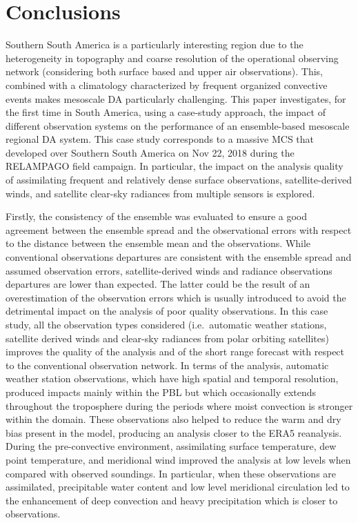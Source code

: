 \documentclass[final,5p,times,twocolumn,authoryear]{elsarticle} %
\begin{document}
\hypertarget{conclusions}{%
\section{Conclusions}\label{conclusions}}

Southern South America is a particularly interesting region due to the heterogeneity in topography and coarse resolution of the operational observing network (considering both surface based and upper air observations). This, combined with a climatology characterized by frequent organized convective events makes mesoscale DA particularly challenging. This paper investigates, for the first time in South America, using a case-study approach, the impact of different observation systems on the performance of an ensemble-based mesoscale regional DA system. This case study corresponds to a massive MCS that developed over Southern South America on Nov 22, 2018 during the RELAMPAGO field campaign. In particular, the impact on the analysis quality of assimilating frequent and relatively dense surface observations, satellite-derived winds, and satellite clear-sky radiances from multiple sensors is explored.

Firstly, the consistency of the ensemble was evaluated to ensure a good agreement between the ensemble spread and the observational errors with respect to the distance between the ensemble mean and the observations. While conventional observations departures are consistent with the ensemble spread and assumed observation errors, satellite-derived winds and radiance observations departures are lower than expected. The latter could be the result of an overestimation of the observation errors which is usually introduced to avoid the detrimental impact on the analysis of poor quality observations.
In this case study, all the observation types considered (i.e.~automatic weather stations, satellite derived winds and clear-sky radiances from polar orbiting satellites) improves the quality of the analysis and of the short range forecast with respect to the conventional observation network. In terms of the analysis, automatic weather station observations, which have high spatial and temporal resolution, produced impacts mainly within the PBL but which occasionally extends throughout the troposphere during the periods where moist convection is stronger within the domain. These observations also helped to reduce the warm and dry bias present in the model, producing an analysis closer to the ERA5 reanalysis. During the pre-convective environment, assimilating surface temperature, dew point temperature, and meridional wind improved the analysis at low levels when compared with observed soundings. In particular, when these observations are assimilated, precipitable water content and low level meridional circulation led to the enhancement of deep convection and heavy precipitation which is closer to observations.
\end{document}
